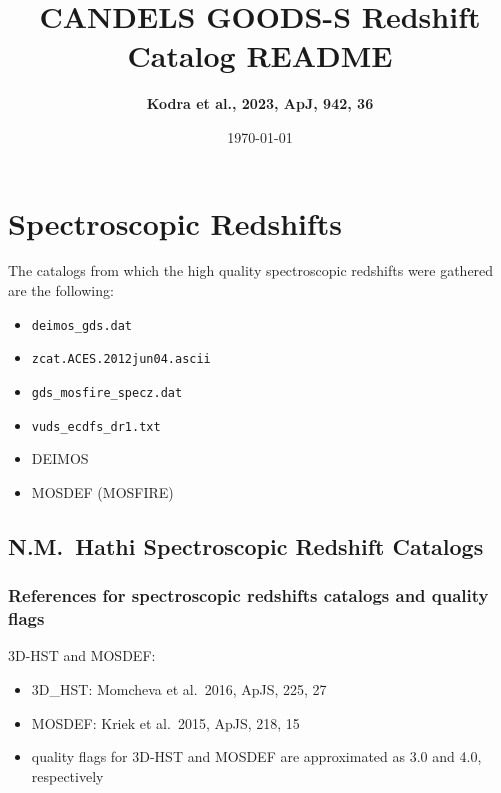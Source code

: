 \documentclass[12pt,onecolumn]{article}
\title{\textbf{CANDELS GOODS-S Redshift Catalog README}}
\author{\textbf{Kodra et al., 2023, ApJ, 942, 36}}
\date{\today}
\begin{document}
\maketitle





\section*{Spectroscopic Redshifts}

The catalogs from which the high quality spectroscopic redshifts were gathered are the following:
\begin{itemize}
\item \texttt{deimos\_gds.dat}
\item \texttt{zcat.ACES.2012jun04.ascii}
\item \texttt{gds\_mosfire\_specz.dat}
\item \texttt{vuds\_ecdfs\_dr1.txt}
\item DEIMOS
\item MOSDEF (MOSFIRE)
\end{itemize}

\subsection*{N.M.~Hathi Spectroscopic Redshift Catalogs}
\subsubsection*{References for spectroscopic redshifts catalogs and quality flags}

\noindent 3D-HST and MOSDEF:
\begin{itemize}
\item 3D\_HST: Momcheva et al.\ 2016, ApJS, 225, 27
\item MOSDEF: Kriek et al.\ 2015, ApJS, 218, 15
\item quality flags for 3D-HST and MOSDEF are approximated as 3.0 and 4.0, respectively
\end{itemize}
\end{document}
